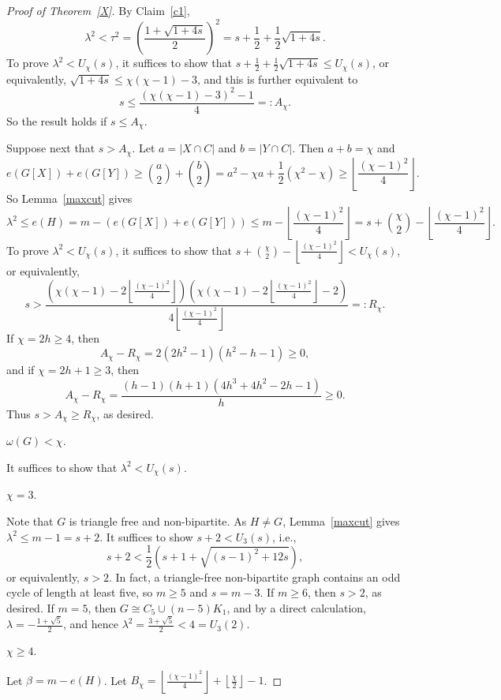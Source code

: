 \documentclass[10pt,a4paper]{amsart}
\begin{document}
\begin{proof}[Proof of Theorem~\ref{X}]
By Claim~\ref{c1},
\[
\lambda^2<\tau^2=\left(\frac{1+\sqrt{1+4s}}2\right)^2=s+\frac12+\frac12\sqrt{1+4s}.
\]
To prove $\lambda^2<U_\chi(s)$, it suffices to show that $s+\frac12+\frac12\sqrt{1+4s}\le U_\chi(s)$, or equivalently, %
$\sqrt{1+4s}\le \chi(\chi-1)-3$, and this is further equivalent to \[
s\le\frac{(\chi(\chi-1)-3)^2-1}{4}=:A_\chi.
\]
So the result holds if $s\le A_\chi$. 

Suppose next that $s>A_\chi$.
 Let $a=|X\cap C|$ and $b=|Y\cap C|$. Then $a+b=\chi$ and 
\[
e(G[X])+e(G[Y])\ge {a\choose 2}+{b\choose 2}=a^2-\chi a+\frac{1}{2}(\chi^2-\chi)
\ge \left\lfloor\frac{(\chi-1)^2}{4}\right\rfloor.
\]
So 
Lemma~\ref{maxcut} gives
$$\lambda^2\le e(H)=m-(e(G[X])+e(G[Y]))\le m-\left\lfloor\frac{(\chi-1)^2}{4}\right\rfloor=s+\binom{\chi}{2}-\left\lfloor\frac{(\chi-1)^2}{4}\right\rfloor.$$
To prove $\lambda^2 <U_\chi(s)$, it suffices to show that
 $s+\binom{\chi}{2}-\left\lfloor\frac{(\chi-1)^2}{4}\right\rfloor< U_\chi(s)$, or equivalently, 
\[
s> \frac{\left(\chi(\chi-1)-2\left\lfloor\frac{(\chi-1)^2}{4}\right\rfloor\right)\left(\chi(\chi-1)-2\left\lfloor\frac{(\chi-1)^2}{4}\right\rfloor-2\right)}{4\left\lfloor\frac{(\chi-1)^2}{4}\right\rfloor}=:R_\chi.
\]
 If $\chi=2h\ge4$, then
\[
A_\chi-R_\chi=2(2h^2-1)(h^2-h-1)\ge0,
\]
and if $\chi=2h+1\ge3$, then
\[
A_\chi-R_\chi=
\frac{(h-1)(h+1)(4h^3+4h^2-2h-1)}h\ge0.
\]
Thus  $s>A_\chi\ge  R_\chi$, as desired. 


  $\omega(G)<\chi$. 

It suffices to show that $\lambda^2 <U_\chi(s)$.

  $\chi=3$. 

Note that  $G$ is triangle free and non-bipartite. As $H\ne G$, Lemma~\ref{maxcut} gives $\lambda^2\le m-1=s+2$. It suffices to show  $s+2<U_3(s)$, i.e., 
\[
s+2<\frac{1}{2}\left(s+1+\sqrt{(s-1)^2+12s} \right),
\] 
 or equivalently, $s> 2$. In fact, a triangle-free non-bipartite graph contains an odd cycle of length at least five, so $m\ge5$ and
$s=m-3$. If $m\ge 6$, then $s>2$, as desired. If $m=5$, then 
$G\cong C_5\cup (n-5)K_1$, and by a direct calculation, $\lambda=-\frac{1+\sqrt5}{2}$, and hence
$\lambda^2=\frac{3+\sqrt5}{2}<4=U_3(2)$. 

  $\chi\ge4$. 

Let
$\beta=m-e(H)$. %
Let $B_\chi=\left\lfloor\frac{(\chi-1)^2}{4}\right\rfloor
 +\left\lfloor\frac{\chi}{2}\right\rfloor-1$.


\end{proof}
\end{document}
